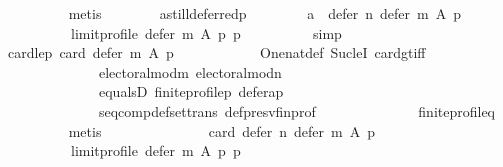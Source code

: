 \begin{isabellebody}
\ \ \ \ \ \ \ \ \isamarkupfalse%
\ metis\isanewline
\ \ \ \ \ \ \isamarkupfalse%
\ a{\isacharunderscore}{\kern0pt}still{\isacharunderscore}{\kern0pt}deferred{\isacharunderscore}{\kern0pt}p{\isacharcolon}{\kern0pt}\isanewline
\ \ \ \ \ \ \ \ {\isachardoublequoteopen}{\isacharbraceleft}{\kern0pt}a{\isacharbraceright}{\kern0pt}\ {\isasymsubseteq}\ defer\ n\ {\isacharparenleft}{\kern0pt}defer\ m\ A\ p{\isacharparenright}{\kern0pt}\isanewline
\ \ \ \ \ \ \ \ \ \ {\isacharparenleft}{\kern0pt}limit{\isacharunderscore}{\kern0pt}profile\ {\isacharparenleft}{\kern0pt}defer\ m\ A\ p{\isacharparenright}{\kern0pt}\ p{\isacharparenright}{\kern0pt}{\isachardoublequoteclose}\isanewline
\ \ \ \ \ \ \ \ \isamarkupfalse%
\ simp\isanewline
\ \ \ \ \ \ \isamarkupfalse%
\ card{\isacharunderscore}{\kern0pt}le{\isacharunderscore}{\kern0pt}{}{\isacharunderscore}{\kern0pt}p{\isacharcolon}{\kern0pt}\ {\isachardoublequoteopen}card\ {\isacharparenleft}{\kern0pt}defer\ m\ A\ p{\isacharparenright}{\kern0pt}\ {\isasymge}\ {}{\isachardoublequoteclose}\isanewline
\ \ \ \ \ \ \ \ \isamarkupfalse%
\ One{\isacharunderscore}{\kern0pt}nat{\isacharunderscore}{\kern0pt}def\ Suc{\isacharunderscore}{\kern0pt}leI\ card{\isacharunderscore}{\kern0pt}gt{\isacharunderscore}{\kern0pt}{}{\isacharunderscore}{\kern0pt}iff\isanewline
\ \ \ \ \ \ \ \ \ \ \ \ \ \ electoral{\isacharunderscore}{\kern0pt}mod{\isacharunderscore}{\kern0pt}m\ electoral{\isacharunderscore}{\kern0pt}mod{\isacharunderscore}{\kern0pt}n\isanewline
\ \ \ \ \ \ \ \ \ \ \ \ \ \ equals{}D\ finite{\isacharunderscore}{\kern0pt}profile{\isacharunderscore}{\kern0pt}p\ defer{\isacharunderscore}{\kern0pt}a{\isacharunderscore}{\kern0pt}p\isanewline
\ \ \ \ \ \ \ \ \ \ \ \ \ \ seq{\isacharunderscore}{\kern0pt}comp{\isacharunderscore}{\kern0pt}def{\isacharunderscore}{\kern0pt}set{\isacharunderscore}{\kern0pt}trans\ def{\isacharunderscore}{\kern0pt}presv{\isacharunderscore}{\kern0pt}fin{\isacharunderscore}{\kern0pt}prof\isanewline
\ \ \ \ \ \ \ \ \ \ \ \ \ \ finite{\isacharunderscore}{\kern0pt}profile{\isacharunderscore}{\kern0pt}q\isanewline
\ \ \ \ \ \ \ \ \isamarkupfalse%
\ metis\isanewline
\ \ \ \ \ \ \isamarkupfalse%
\isanewline
\ \ \ \ \ \ \ \ {\isachardoublequoteopen}card\ {\isacharparenleft}{\kern0pt}defer\ n\ {\isacharparenleft}{\kern0pt}defer\ m\ A\ p{\isacharparenright}{\kern0pt}\isanewline
\ \ \ \ \ \ \ \ \ \ {\isacharparenleft}{\kern0pt}limit{\isacharunderscore}{\kern0pt}profile\ {\isacharparenleft}{\kern0pt}defer\ m\ A\ p{\isacharparenright}{\kern0pt}\ p{\isacharparenright}{\kern0pt}{\isacharparenright}{\kern0pt}\ {\isacharequal}{\kern0pt}\ {}{\isachardoublequoteclose}\isanewline

\end{isabellebody}
